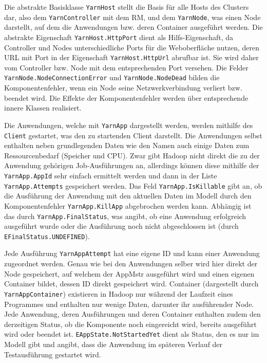 Die abstrakte Basisklasse \texttt{YarnHost} stellt die Basis für alle Hosts des Clusters dar, also dem \texttt{YarnController} mit dem \ac{RM}, und dem \texttt{YarnNode}, was einen Node darstellt, auf dem die Anwendungen bzw. deren Container ausgeführt werden. Die abstrakte Eigenschaft \texttt{YarnHost.HttpPort} dient als Hilfs-Eigenschaft, da Controller und Nodes unterschiedliche Ports für die Weboberfläche nutzen, deren URL mit Port in der Eigenschaft \texttt{YarnHost.HttpUrl} abrufbar ist. Sie wird daher vom Controller bzw. Node mit dem entsprechenden Port versehen. Die Felder \texttt{YarnNode.NodeConnectionError} und \texttt{YarnNode.NodeDead} bilden die Komponentenfehler, wenn ein Node seine Netzwerkverbindung verliert bzw. beendet wird. Die Effekte der Komponentenfehler werden über entsprechende innere Klassen realisiert.

Die Anwendungen, welche mit \texttt{YarnApp} dargestellt werden, werden mithilfe des \texttt{Client} gestartet, was den zu startenden Client darstellt. Die Anwendungen selbst enthalten neben grundlegenden Daten wie \zB den Namen auch einige Daten zum Ressourcenbedarf (Speicher und CPU). Zwar gibt Hadoop nicht direkt die zu der Anwendung gehörigen Job-Ausführungen an, allerdings können diese mithilfe der \texttt{YarnApp.AppId} sehr einfach ermittelt werden und dann in der Liste \texttt{YarnApp.Attempts} gespeichert werden. Das Feld \texttt{YarnApp.IsKillable} gibt an, ob die Ausführung der Anwendung mit den aktuellen Daten im Modell durch den Komponentenfehler \texttt{YarnApp.KillApp} abgebrochen werden kann. Abhängig ist das durch \texttt{YarnApp.FinalStatus}, was angibt, ob eine Anwendung erfolgreich ausgeführt wurde oder die Ausführung noch nicht abgeschlossen ist (durch \texttt{EFinalStatus.UNDEFINED}).

Jede Ausführung \texttt{YarnAppAttempt} hat eine eigene ID und kann einer Anwendung zugeordnet werden. Genau wie bei den Anwendungen selber wird hier direkt der Node gespeichert, auf welchem der \ac{AppMstr} ausgeführt wird und einen eigenen Container bildet, dessen ID direkt gespeichert wird. Container (dargestellt durch \texttt{YarnAppContainer}) existieren in Hadoop nur während der Laufzeit eines Programmes und enthalten nur wenige Daten, darunter ihr ausführender Node. Jede Anwendung, deren Ausführungen und deren Container enthalten zudem den derzeitigen Status, ob die Komponente noch eingereicht wird, bereits ausgeführt wird oder beendet ist. \texttt{EAppState.NotStartedYet} dient als Status, den es nur im Modell gibt und angibt, dass die Anwendung im späteren Verlauf der Testausführung gestartet wird.

